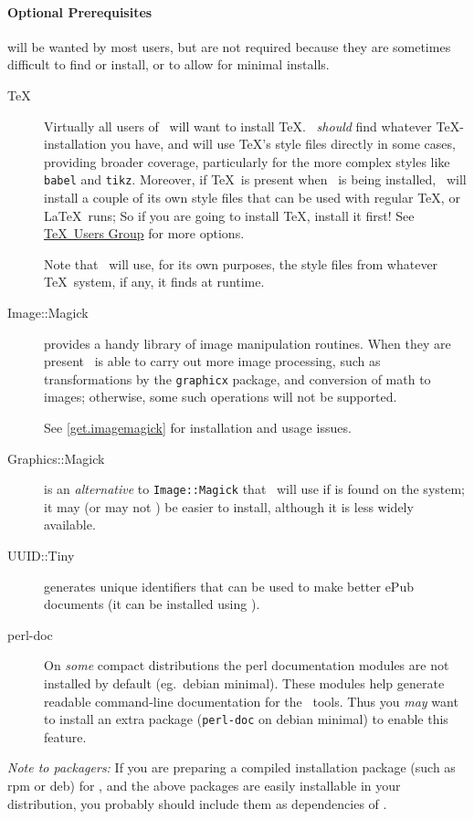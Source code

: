 \documentclass{article}
\begin{document}
\paragraph{Optional Prerequisites} will be wanted by most users,
but are not required because they are sometimes difficult to find or install,
or to allow for minimal installs.
\begin{description}
\item[\TeX] Virtually all users of \LaTeXML\ will want to install \TeX.  \LaTeXML\ 
\emph{should} find whatever \TeX-installation you have, and will
use \TeX's style files directly in some cases, providing broader coverage,
particularly for the more complex styles like \texttt{babel} and \texttt{tikz}.
Moreover, if \TeX\ is present when \LaTeXML\ is being installed,
\LaTeXML\ will install a couple of its own style files that can be used
with regular \TeX, or \LaTeX\ runs;
So if you are going to install \TeX, install it first!
See \href{https://www.tug.org}{\TeX\ Users Group} for more options.

Note that \LaTeXML\ will use, for its own purposes, the style files from whatever
\TeX\ system, if any, it finds at runtime.

\item[Image::Magick] provides a handy library of image manipulation routines.
When they are present \LaTeXML\ is able to carry out more image processing,
such as transformations by the \texttt{graphicx} package, and conversion of math to images;
otherwise, some such operations will not be supported.

See \ref{get.imagemagick} for installation and usage issues.

\item[Graphics::Magick] is an \emph{alternative} to \texttt{Image::Magick} that \LaTeXML\ will
use if is found on the system; it may (or may not ) be easier to install, although it
is less widely available.

\item[UUID::Tiny] generates unique identifiers that can be used to make better ePub documents
  (it can be installed using \htmlref{CPAN}{get.cpan.prereq}).

\item[perl-doc]\label{get.perl-doc}
 On \emph{some} compact distributions the perl documentation modules
 are not installed by default (eg.~debian minimal). These modules help generate
 readable command-line documentation for the \LaTeXML\ tools. Thus you \emph{may}
 want to install an extra package (\texttt{perl-doc} on debian minimal) to enable this feature. 

\end{description}
\emph{Note to packagers:} If you are preparing a compiled installation package (such as rpm or deb) for
\LaTeXML, and the above packages are easily installable in your distribution,
you probably should include them as dependencies of \LaTeXML.
\end{document}
